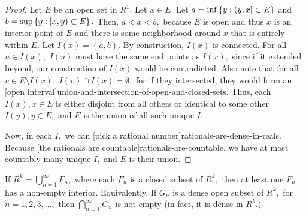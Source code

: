 \documentclass{article}
\begin{document}
\begin{proof}
Let $E$ be an open set in $R^1.$ Let $x \in E.$ Let $a = \inf \left\{ y : (y, x] \subset E \right\}$ and $b = \sup \left\{ y : [x, y) \subset E \right\}.$ Then, $a < x < b,$ because $E$ is open and thus $x$ is an \@{interior-point} of $E$ and there is some \@{neighborhood} around $x$ that is entirely within $E.$ Let $I(x) = (a, b).$ By construction, $I(x)$ is \@{connected}. For all $u \in I(x),$ $I(u)$ must have the same end points as $I(x),$ since if it extended beyond, our construction of $I(x)$ would be contradicted. Also note that for all $v \in E \setminus I(x),$ $I(v) \cap I(x) = \emptyset,$ for if they intersected, they would form an \@[open interval]{union-and-intersection-of-open-and-closed-sets}. Thus, each $I(x), x \in E$ is either disjoint from all others or identical to some other $I(y), y \in E,$ and $E$ is the union of all such unique $I.$

Now, in each $I,$ we can \@[pick a rational number]{rationals-are-dense-in-reals}. Because \@[the rationals are countable]{rationals-are-countable}, we have at most countably many unique $I,$ and $E$ is their union.
\end{proof}

\begin{theorem}\label{baire-category-theorem-special-case}
If $R^k = \bigcup_{n=1}^{\infty}F_n,$ where each $F_n$ is a \@{closed} subset of $R^k,$ then at least one $F_n$ has a non-empty interior. Equivalently, If $G_n$ is a \@{dense} \@{open} subset of $R^k,$ for $n = 1, 2, 3, \dots,$ then $\bigcap_{n=1}^\infty G_n$ is not empty (in fact, it is dense in $R^k$.)
\end{theorem}
\end{document}
